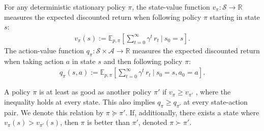 \documentclass[twoside,11pt]{article}
\newcommand{\aset}{\mathcal{A}}
\newcommand{\sset}{\mathcal{S}}
\newcommand{\real}{\mathbb{R}}
\newcommand{\transit}{\tau}
\newcommand{\pol}{\pi}
\newcommand{\discount}{\gamma}
\DeclareRobustCommand{\reviewbarstart}{%
  \ifhmode %
    \vadjust{\vbox to 0pt{%
      \vskip-\ht\strutbox %
      \vskip-\dp\strutbox %
      \cbstart[\changebarwidth] %
      \vss %
    }}%
  \else %
    \cbstart[\changebarwidth]%
  \fi %
} %
\providecommand{\DIFadd}[1]{#1} %
\providecommand{\DIFaddbegin}{\reviewbarstart} %
\providecommand{\DIFaddend}{\protect\cbend} %
\def\DIFadd#1{#1}%
\def\DIFaddbegin{}%
\def\DIFaddend{}%
\begin{document}
For any \DIFaddbegin \DIFadd{deterministic stationary }\DIFaddend policy $\pi$,
the state-value function $v_\pol : \sset \to \real$ 
measures the expected discounted return when following policy $\pol$ starting in state $s$:
\begin{align*} 
    v_\pol(s)
    :=
    \mathbb E_{p, \pi} \left[ \sum_{t=0}^{\infty} \gamma^t \, r_t  \ \bigg| \ s_0 = s \right] .
\end{align*}
The action-value function $q_\pol : \sset \times \aset \to \real$ measures the expected discounted return when taking action $a$ in state $s$ and then following policy $\pol$:
\begin{align*} 
    q_\pol(s,a)
    :=
    \mathbb E_{p, \pi} \left[ \sum_{t=0}^{\infty} \gamma^t \, r_t  \ \bigg| \ s_0 = s, a_0 = a \right] .
\end{align*}

A policy $\pi$ is at least as good as another policy $\pi'$ if $v_{\pi} \ge v_{\pi'}$ \DIFaddbegin \DIFadd{, where the inequality holds at every state.
This also implies }\DIFaddend $q_{\pi} \ge q_{\pi'}$ \DIFaddbegin \DIFadd{at every state-action pair}\DIFaddend .
We denote this relation by $\pi \succeq \pi'$.
If, additionally, there exists a state where $v_{\pi}(s) > v_{\pi'}(s)$, then $\pi$ is better than $\pi'$, denoted $\pi \succ \pi'$.
\end{document}
